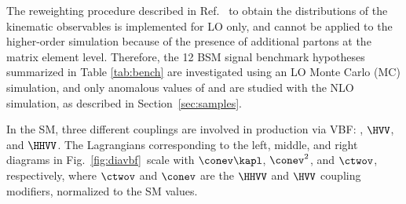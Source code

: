 \documentclass[11pt,a4paper,cmspaper,final,collab]{cms-tdr}
\begin{document}
The reweighting procedure described in Ref.~\cite{Dall'Osso:2015aia} to obtain the distributions of the kinematic observables is implemented for LO only, and cannot be applied to the higher-order simulation because of the presence of additional partons at the matrix element level. Therefore, the 12 BSM signal benchmark hypotheses summarized in Table \ref{tab:bench} are investigated using an LO Monte Carlo (MC) simulation, and only anomalous values of \kapl and \kapt are studied with the NLO simulation, as described in Section~\ref{sec:samples}.


\begin{table}[h]
  \centering
{}
\end{table}

In the SM, three different couplings are
involved in \HH production via VBF: \lbdHHH, $\HVV$, and $\HHVV$.
The Lagrangians corresponding to the left, middle, and right diagrams in Fig.~\ref{fig:diavbf}~scale with $\conev\kapl$, $\conev^2$, and $\ctwov$, respectively, where $\ctwov$ and $\conev$ are the $\HHVV$ and $\HVV$ coupling modifiers, normalized to the SM values. 
\end{document}

